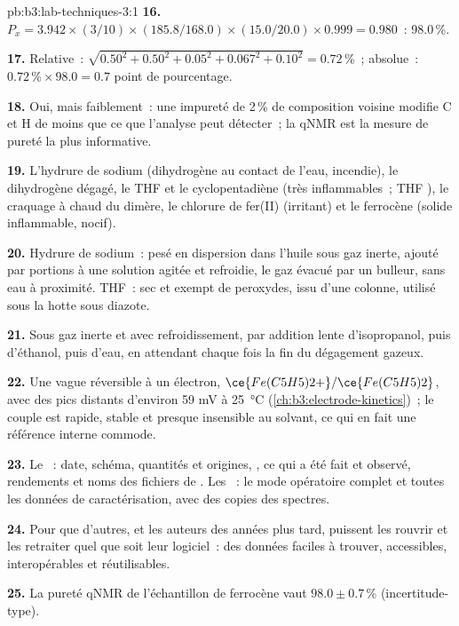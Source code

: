 \begin{solution}{pb:b3:lab-techniques-3:1}
\textbf{16.} $P_x = 3.942 \times (3/10) \times (185.8/168.0) \times (15.0/20.0) \times 0.999 = 0.980$~: 98.0\,\%.

\textbf{17.} Relative~: $\sqrt{0.50^2 + 0.50^2 + 0.05^2 + 0.067^2 + 0.10^2} = 0.72$\,\%~; absolue~: $0.72\,\% \times 98.0 = 0.7$ point de pourcentage.

\textbf{18.} Oui, mais faiblement~: une impureté de 2\,\% de composition
voisine modifie C et H de moins que ce que l'analyse peut détecter~; la
qNMR est la mesure de pureté la plus informative.

\textbf{19.} L'hydrure de sodium (dihydrogène au contact de l'eau,
incendie), le dihydrogène dégagé, le THF et le cyclopentadiène (très
inflammables~; THF ), le craquage à chaud du dimère, le
chlorure de fer(II) (irritant) et le ferrocène (solide inflammable, nocif).

\textbf{20.} Hydrure de sodium~: pesé en dispersion dans l'huile sous gaz
inerte, ajouté par portions à une solution agitée et refroidie, le gaz
évacué par un bulleur, sans eau à proximité. THF~: sec et exempt de
peroxydes, issu d'une colonne, utilisé sous la hotte sous diazote.

\textbf{21.} Sous gaz inerte et avec refroidissement, par addition lente
d'isopropanol, puis d'éthanol, puis d'eau, en attendant chaque fois la fin
du dégagement gazeux.

\textbf{22.} Une vague réversible à un électron, $\ce{Fe(C5H5)2+}/\ce{Fe(C5H5)2}$, avec des pics distants d'environ 59 mV à \qty{25}{\celsius}
(\cref{ch:b3:electrode-kinetics})~; le couple est rapide, stable et presque
insensible au solvant, ce qui en fait une référence interne commode.

\textbf{23.} Le ~: date, schéma, quantités et
origines, , ce qui a été fait et observé, rendements
et noms des fichiers de . Les ~: le mode opératoire complet et toutes les données de
caractérisation, avec des copies des spectres.

\textbf{24.} Pour que d'autres, et les auteurs des années plus tard,
puissent les rouvrir et les retraiter quel que soit leur logiciel~: des
données faciles à trouver, accessibles, interopérables et réutilisables.

\textbf{25.} La pureté qNMR de l'échantillon de ferrocène vaut $98.0 \pm 0.7$\,\% (incertitude-type).
\end{solution}
